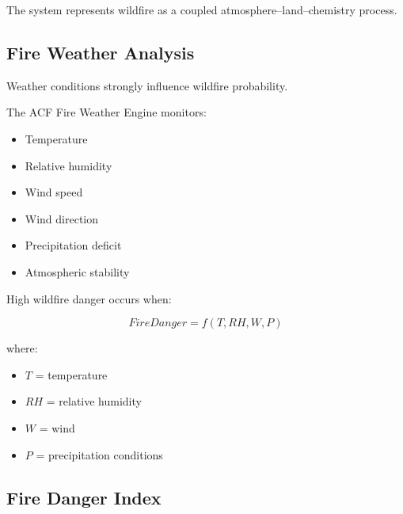 The system represents wildfire as a coupled
atmosphere--land--chemistry process.



\subsection{Fire Weather Analysis}

Weather conditions strongly influence wildfire probability.

The ACF Fire Weather Engine monitors:

\begin{itemize}

\item Temperature

\item Relative humidity

\item Wind speed

\item Wind direction

\item Precipitation deficit

\item Atmospheric stability

\end{itemize}


High wildfire danger occurs when:

\[
FireDanger
=
f(T,RH,W,P)
\]


where:

\begin{itemize}

\item $T$ = temperature

\item $RH$ = relative humidity

\item $W$ = wind

\item $P$ = precipitation conditions

\end{itemize}


\subsection{Fire Danger Index}

